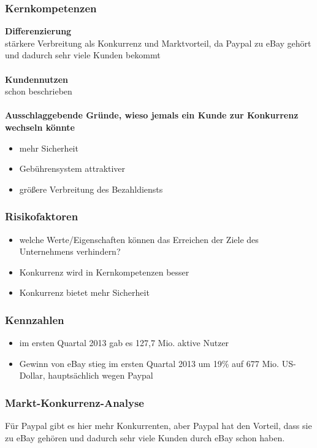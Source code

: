 \subsubsection{Kernkompetenzen}
\textbf{Differenzierung}\\
stärkere Verbreitung als Konkurrenz und Marktvorteil, da Paypal zu eBay gehört und dadurch sehr viele Kunden bekommt\\
\\
\textbf{Kundennutzen}\\
schon beschrieben\\
\\
\textbf{Ausschlaggebende Gründe, wieso jemals ein Kunde zur Konkurrenz wechseln könnte}
\begin{itemize}
\item mehr Sicherheit
\item Gebührensystem attraktiver
\item größere Verbreitung des Bezahldiensts
\end{itemize}

\subsubsection{Risikofaktoren}
\begin{itemize}
\item welche Werte/Eigenschaften können das Erreichen der Ziele des Unternehmens verhindern?
\item Konkurrenz wird in Kernkompetenzen besser
\item Konkurrenz bietet mehr Sicherheit
\end{itemize}

\subsubsection{Kennzahlen}
\begin{itemize}
\item im ersten Quartal 2013 gab es 127,7 Mio. aktive Nutzer
\item Gewinn von eBay stieg im ersten Quartal 2013 um 19\% auf 677 Mio. US-Dollar, hauptsächlich wegen Paypal
\end{itemize}
\subsubsection{Markt-Konkurrenz-Analyse}
Für Paypal gibt es hier mehr Konkurrenten, aber Paypal hat den Vorteil, dass sie zu eBay gehören und dadurch sehr viele Kunden durch eBay schon haben.
